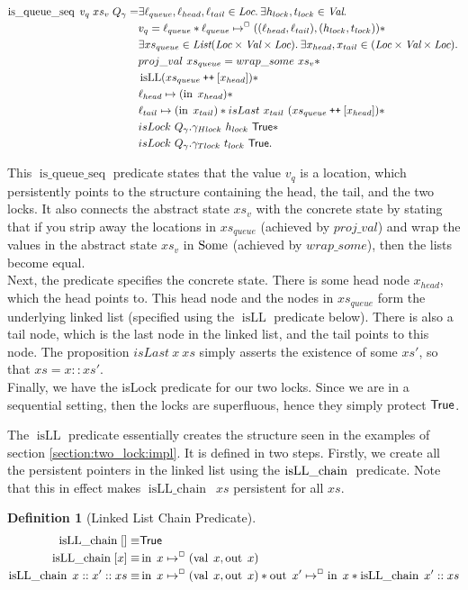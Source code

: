 \documentclass[twoside,11pt,openright]{report}
\newtheorem{definition}{Definition}[section]
\newcommand{\isqueueseq}{\operatorname{is\_queue\_seq}}
\newcommand{\isLLchain}[1]{\operatorname{isLL\_chain} \; #1}
\newcommand{\isLL}{\operatorname{isLL}}
\newcommand{\nIn}[1]{\operatorname{in} \; #1}
\newcommand{\nVal}[1]{\operatorname{val} \; #1}
\newcommand{\nOut}[1]{\operatorname{out} \; #1}
\newcommand\catenate{\mathbin{\text{\ttfamily\upshape ++}}}
\begin{document}
\begin{align*}
  \isqueueseq \; v_q \; xs_v \; Q_\gname = &\Exists \loc_{queue}, \loc_{head}, \loc_{tail} \in \Loc . \Exists h_{lock}, t_{lock} \in \Val . \\
  &v_q = \loc_{queue} \ast \loc_{queue} \mapsto^{\persistently} ((\loc_{head}, \loc_{tail}), (h_{lock}, t_{lock})) \ast\\
  &\Exists xs_{queue} \in \List (\Loc \times \Val \times \Loc) . \Exists x_{head}, x_{tail} \in (\Loc \times \Val \times \Loc) .\\
	&proj\_val \ xs_{queue} = wrap\_some \ xs_v \ast\\
	&\isLL (xs_{queue} \catenate [x_{head}]) \ast\\
	&\loc_{head} \mapsto (\nIn{x_{head}}) \ast\\
	&\loc_{tail} \mapsto (\nIn{x_{tail}}) \ast isLast \ x_{tail} \ (xs_{queue} \catenate [x_{head}]) \ast\\
	&isLock \ Q_\gname.\gname_{Hlock} \ h_{lock} \ \TRUE \ast\\
	&isLock \ Q_\gname.\gname_{Tlock} \ t_{lock} \ \TRUE.
\end{align*}

This $\isqueueseq$ predicate states that the value $v_q$ is a location, which persistently points to the structure containing the head, the tail, and the two locks. It also connects the abstract state $xs_v$ with the concrete state by stating that if you strip away the locations in $xs_{queue}$ (achieved by $proj\_val$) and wrap the values in the abstract state $xs_v$ in $\operatorname{Some}$ (achieved by $wrap\_some$), then the lists become equal.\\
Next, the predicate specifies the concrete state. There is some head node $x_{head}$, which the head points to. This head node and the nodes in $xs_{queue}$ form the underlying linked list (specified using the $\isLL$ predicate below). There is also a tail node, which is the last node in the linked list, and the tail points to this node. The proposition $isLast\ x\ xs$ simply asserts the existence of some $xs'$, so that $xs = x :: xs'$.\\
Finally, we have the isLock predicate for our two locks. Since we are in a sequential setting, then the locks are superfluous, hence they simply protect $\textsf{True}$.

The $\isLL$ predicate essentially creates the structure seen in the examples of section \ref{section:two_lock:impl}. It is defined in two steps. Firstly, we create all the persistent pointers in the linked list using the $\isLLchain$ predicate. Note that this in effect makes $\isLLchain \ xs$ persistent for all $xs$.
\begin{definition}[Linked List Chain Predicate]
  \begin{align*}
    \isLLchain{[]} \equiv& \TRUE\\
    \isLLchain{[x]} \equiv& \nIn{x} \mapsto^{\persistently} (\nVal{x}, \nOut{x})\\
    \isLLchain{x :: x' :: xs} \equiv& \nIn{x} \mapsto^{\persistently} (\nVal{x}, \nOut{x}) \ast \nOut{x'} \mapsto^{\persistently} \nIn{x} \ast \isLLchain{x' :: xs}
  \end{align*}
\end{definition}
\end{document}
